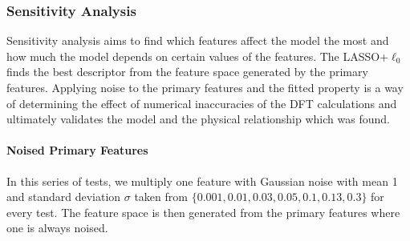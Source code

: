 \documentclass[11pt,oneside,czech,american]{book} %
\theoremstyle{plain}
\theoremstyle{definition}
\begin{document}
\subsubsection{Sensitivity Analysis}
Sensitivity analysis aims to find which features affect the model the most and how much the model depends on certain values of the features. The LASSO+$\ell_{0}$ finds the best descriptor from the feature space generated by the primary features. Applying noise to the primary features and the fitted property is a way of determining the effect of numerical inaccuracies of the DFT calculations and ultimately validates the model and the physical relationship which was found.
\paragraph{Noised Primary Features}
In this series of tests, we multiply one feature with Gaussian noise with mean 1 and standard deviation $\sigma$ taken from $\{0.001, 0.01, 0.03, 0.05, 0.1, 0.13, 0.3\}$ for every test. The feature space is then generated from the primary features where one is always noised.
\end{document}

